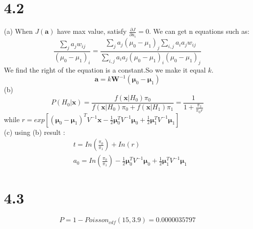 \documentclass{article}
\begin{document}
\begin{CJK*}{GBK}{song}
\section{4.2}
(a)
When $J(\textbf{a})$ have max value, satisfy $\frac{\partial J}{\partial a_i}=0$. We can get n equations such as:
\begin{equation}
\frac{\sum_j a_jw_{ij}}{(\mu_0-\mu_1)_i}=\frac{\sum_j a_j(\mu_0-\mu_1)_j\sum_{i,j} a_ia_jw_{ij}}{\sum_{i,j} a_ia_j(\mu_0-\mu_1)_i(\mu_0-\mu_1)_j}
\end{equation}
We find the right of the equation is a constant.So we make it equal $k$.
\begin{equation}
\textbf{a}=k\textbf{W}^{-1}(\boldsymbol{\mu}_0-\boldsymbol{\mu}_1)
\end{equation}
(b)
\begin{equation}
P(H_0|\textbf{x})=\frac{f(\textbf{x}|H_0)\pi_0}{f(\textbf{x}|H_0)\pi_0+f(\textbf{x}|H_1)\pi_1}=\frac{1}{1+\frac{\pi_1}{\pi_0r}}
\end{equation}
while $r=exp[(\boldsymbol{\mu}_0-\boldsymbol{\mu}_1)^TV^{-1}\textbf{x}-\frac{1}{2}\boldsymbol{\mu}_0^TV^{-1}\boldsymbol{\mu}_0+\frac{1}{2}\boldsymbol{\mu}_1^TV^{-1}\boldsymbol{\mu}_1]$\\
(c)
using (b) result :
\begin{equation}
\begin{aligned}
&t=In(\frac{\pi_0}{\pi_1})+In(r)\\
&a_0=In(\frac{\pi_0}{\pi_1})-\frac{1}{2}\boldsymbol{\mu}_0^TV^{-1}\boldsymbol{\mu}_0+\frac{1}{2}\boldsymbol{\mu}_1^TV^{-1}\boldsymbol{\mu}_1
\end{aligned}
\end{equation}

\section{4.3}
\begin{equation}
P=1-Poisson_{cdf}(15,3.9)=0.0000035797
\end{equation}



\end{CJK*}
\end{document}
